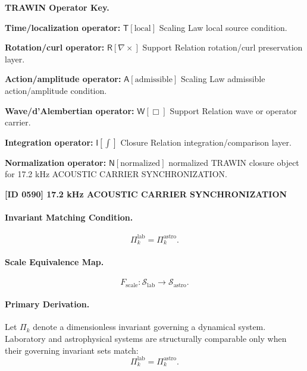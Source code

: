 \par\vspace{0.45\baselineskip}
\noindent\begin{minipage}[t]{\linewidth}
\begingroup
\small
\raggedright
\textbf{TRAWIN Operator Key.}\par
\noindent\textbf{Time/localization operator:} $\mathsf{T}\!\left[\mathrm{local}\right]$ Scaling Law local source condition.\par
\noindent\textbf{Rotation/curl operator:} $\mathsf{R}\!\left[\nabla\times\right]$ Support Relation rotation/curl preservation layer.\par
\noindent\textbf{Action/amplitude operator:} $\mathsf{A}\!\left[\mathrm{admissible}\right]$ Scaling Law admissible action/amplitude condition.\par
\noindent\textbf{Wave/d'Alembertian operator:} $\mathsf{W}\!\left[\Box\right]$ Support Relation wave or operator carrier.\par
\noindent\textbf{Integration operator:} $\mathsf{I}\!\left[\int\right]$ Closure Relation integration/comparison layer.\par
\noindent\textbf{Normalization operator:} $\mathsf{N}\!\left[\mathrm{normalized}\right]$ normalized TRAWIN closure object for 17.2 kHz ACOUSTIC CARRIER SYNCHRONIZATION.\par
\endgroup
\end{minipage}

\clearpage
\noindent\textbf{[ID 0590] 17.2 kHz ACOUSTIC CARRIER SYNCHRONIZATION}\par
\vspace{0.35em}
\paragraph{Invariant Matching Condition.}
\begin{equation}
\Pi_k^{\mathrm{lab}}
=
\Pi_k^{\mathrm{astro}} .
\end{equation}

\paragraph{Scale Equivalence Map.}
\begin{equation}
F_{\mathrm{scale}}:
\mathcal{S}_{\mathrm{lab}}
\longrightarrow
\mathcal{S}_{\mathrm{astro}} .
\end{equation}

\paragraph{Primary Derivation.}
Let $\Pi_k$ denote a dimensionless invariant governing a dynamical system.  
Laboratory and astrophysical systems are structurally comparable only when their governing invariant sets match:
\begin{equation}
\Pi_k^{\mathrm{lab}}
=
\Pi_k^{\mathrm{astro}} .
\end{equation}

